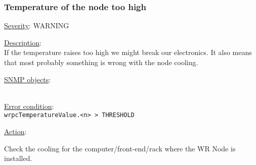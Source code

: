 \subsubsection{\bf Temperature of the node too high}
		\label{fail:other:temp}
		\begin{pck_descr}
			\item [] \underline{Severity}: WARNING
			\item [] \underline{Description}:\\
				If the temperature raises too high we might break our electronics. It
				also means that most probably something is wrong with the node cooling.
			\item [] \underline{SNMP objects}:\\
				{\footnotesize
				\\
				 }
			\item [] \underline{Error condition}:\\
				{\footnotesize
				\texttt{wrpcTemperatureValue.<n> > THRESHOLD} }
      \item [] \underline{Action}:
        \begin{pck_proc}
        \item Check the cooling for the computer/front-end/rack where the WR
          Node is installed.
        \end{pck_proc}
		\end{pck_descr}
